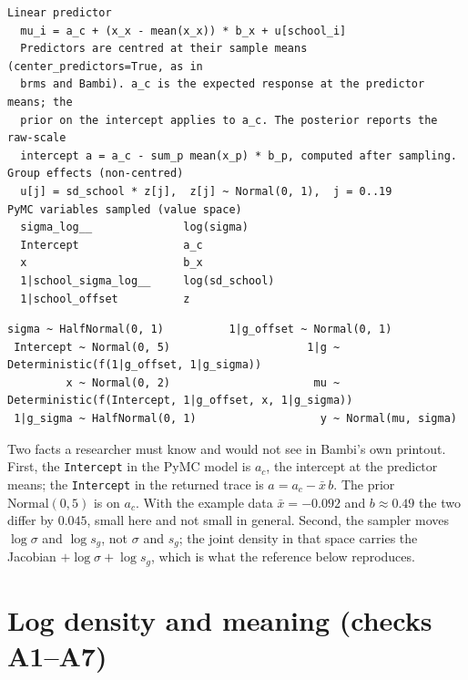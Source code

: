 \documentclass[11pt]{article}
\newcommand{\code}[1]{\texttt{#1}}
\begin{document}
\begin{lstlisting}[numbers=none]
Linear predictor
  mu_i = a_c + (x_x - mean(x_x)) * b_x + u[school_i]
  Predictors are centred at their sample means (center_predictors=True, as in
  brms and Bambi). a_c is the expected response at the predictor means; the
  prior on the intercept applies to a_c. The posterior reports the raw-scale
  intercept a = a_c - sum_p mean(x_p) * b_p, computed after sampling.
Group effects (non-centred)
  u[j] = sd_school * z[j],  z[j] ~ Normal(0, 1),  j = 0..19
PyMC variables sampled (value space)
  sigma_log__              log(sigma)
  Intercept                a_c
  x                        b_x
  1|school_sigma_log__     log(sd_school)
  1|school_offset          z
\end{lstlisting}
\begin{lstlisting}[numbers=none]
     sigma ~ HalfNormal(0, 1)          1|g_offset ~ Normal(0, 1)
 Intercept ~ Normal(0, 5)                     1|g ~ Deterministic(f(1|g_offset, 1|g_sigma))
         x ~ Normal(0, 2)                      mu ~ Deterministic(f(Intercept, 1|g_offset, x, 1|g_sigma))
 1|g_sigma ~ HalfNormal(0, 1)                   y ~ Normal(mu, sigma)
\end{lstlisting}

Two facts a researcher must know and would not see in Bambi's own printout. First, the
\code{Intercept} in the PyMC model is $a_c$, the intercept at the predictor means; the
\code{Intercept} in the returned trace is $a = a_c - \bar x\, b$. The prior
$\mathrm{Normal}(0,5)$ is on $a_c$. With the example data $\bar x = -0.092$ and $b\approx 0.49$
the two differ by $0.045$, small here and not small in general. Second, the sampler moves
$\log\sigma$ and $\log s_g$, not $\sigma$ and $s_g$; the joint density in that space carries
the Jacobian $+\log\sigma + \log s_g$, which is what the reference below reproduces.

\section{Log density and meaning (checks A1--A7)}
\end{document}
